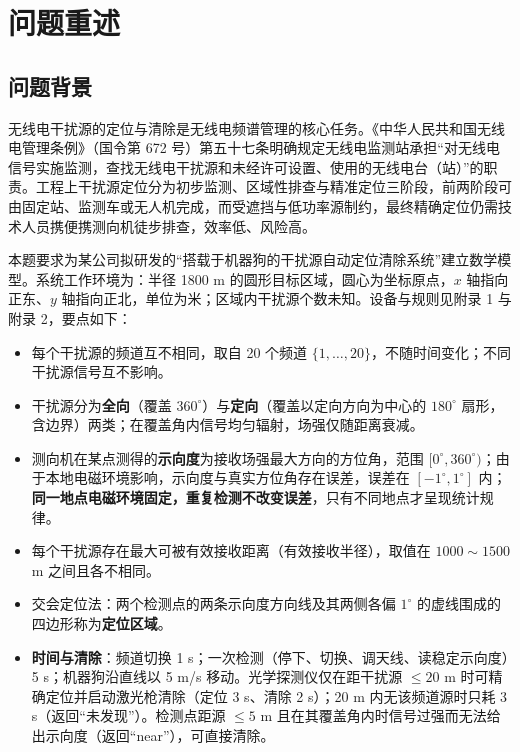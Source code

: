 \documentclass[withoutpreface,bwprint]{cumcmthesis}
\begin{document}
\thispagestyle{empty}

\section{问题重述}

\subsection{问题背景}

无线电干扰源的定位与清除是无线电频谱管理的核心任务。《中华人民共和国无线电管理条例》（国令第 672 号）第五十七条明确规定无线电监测站承担“对无线电信号实施监测，查找无线电干扰源和未经许可设置、使用的无线电台（站）”的职责\cite{reg672}。工程上干扰源定位分为初步监测、区域性排查与精准定位三阶段，前两阶段可由固定站、监测车或无人机完成，而受遮挡与低功率源制约，最终精确定位仍需技术人员携便携测向机徒步排查，效率低、风险高。

本题要求为某公司拟研发的“搭载于机器狗的干扰源自动定位清除系统”建立数学模型。系统工作环境为：半径 1800 m 的圆形目标区域，圆心为坐标原点，$x$ 轴指向正东、$y$ 轴指向正北，单位为米；区域内干扰源个数未知。设备与规则见附录 1 与附录 2，要点如下：

\begin{itemize}
  \item 每个干扰源的频道互不相同，取自 20 个频道 $\{1,\dots,20\}$，不随时间变化；不同干扰源信号互不影响。
  \item 干扰源分为\textbf{全向}（覆盖 $360^{\circ}$）与\textbf{定向}（覆盖以定向方向为中心的 $180^{\circ}$ 扇形，含边界）两类；在覆盖角内信号均匀辐射，场强仅随距离衰减。
  \item 测向机在某点测得的\textbf{示向度}为接收场强最大方向的方位角，范围 $[0^{\circ},360^{\circ})$；由于本地电磁环境影响，示向度与真实方位角存在误差，误差在 $[-1^{\circ},1^{\circ}]$ 内；\textbf{同一地点电磁环境固定，重复检测不改变误差}，只有不同地点才呈现统计规律。
  \item 每个干扰源存在最大可被有效接收距离（有效接收半径），取值在 $1000\sim1500$ m 之间且各不相同。
  \item 交会定位法：两个检测点的两条示向度方向线及其两侧各偏 $1^{\circ}$ 的虚线围成的四边形称为\textbf{定位区域}。
  \item \textbf{时间与清除}：频道切换 1 s；一次检测（停下、切换、调天线、读稳定示向度）5 s；机器狗沿直线以 5 m/s 移动。光学探测仪仅在距干扰源 $\le20$ m 时可精确定位并启动激光枪清除（定位 3 s、清除 2 s）；20 m 内无该频道源时只耗 3 s（返回“未发现”）。检测点距源 $\le5$ m 且在其覆盖角内时信号过强而无法给出示向度（返回“near”），可直接清除。
\end{itemize}
\end{document}
